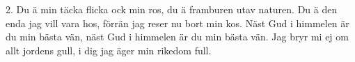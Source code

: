 2.  Du ä min täcka flicka ock min ros,
    du ä framburen utav naturen.
    Du ä den enda jag vill vara hos,
    förrän jag reser nu bort min kos.
    Näst Gud i himmelen är du min bästa vän,
    näst Gud i himmelen är du min bästa vän.
    Jag bryr mi ej om allt jordens gull,
    i dig jag äger min rikedom full.
